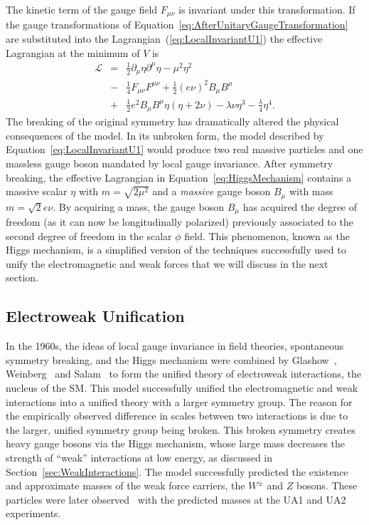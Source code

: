 The kinetic term of the gauge field $F_{\mu\nu}$ is invariant under this
transformation.  If the gauge transformations of
Equation~\ref{eq:AfterUnitaryGaugeTransformation} are substituted into the
Lagrangian~(\ref{eq:LocalInvariantU1}) the effective Lagrangian at the minimum
of $V$ is
\begin{eqnarray}
  \mathcal{L} &=& \frac{1}{2} \partial_\mu \eta \partial^\mu \eta -
  \mu^2 \eta^2  \nonumber \\
  &-& \frac{1}{4} F_{\mu\nu} F^{\mu\nu} + \frac{1}{2} (e\nu)^2 B_\mu B^\mu
  \nonumber \\
  &+& \frac{1}{2} e^2 B_\mu B^\mu \eta (\eta + 2 \nu) - \lambda \nu \eta^3 -
  \frac{\lambda }{4}\eta^4.
  \label{eq:HiggsMechanism}
\end{eqnarray}
The breaking of the original symmetry has dramatically altered the physical
consequences of the model.  In its unbroken form, the model described by
Equation~\ref{eq:LocalInvariantU1} would produce two real massive particles and
one massless gauge boson mandated by local gauge invariance.  After symmetry
breaking, the effective Lagrangian in Equation~\ref{eq:HiggsMechanism} contains
a massive scalar $\eta$ with $m = \sqrt{2\mu^2}$ and a \emph{massive} gauge
boson $B_\mu$ with mass $m = \sqrt 2 e\nu$.  By acquiring a mass, the gauge
boson $B_\mu$ has acquired the degree of freedom (as it can now be
longitudinally polarized) previously associated to the second degree of freedom
in the scalar $\phi$ field.  This phenomenon, known as the Higgs mechanism,
is a simplified version of the techniques successfully used to unify the
electromagnetic and weak forces that we will discuss in the next section.  

\subsection{Electroweak Unification}
\label{sec:ElectroweakUnification} In the 1960s, the ideas of local gauge
invariance in field theories, spontaneous symmetry breaking, and the Higgs
mechanism were combined by Glashow~\cite{Glashow:1961tr},
Weinberg~\cite{Weinberg:1967tq} and Salam~\cite{Salam:1968rm} to form the
unified theory of electroweak interactions, the nucleus of the SM\@.
This model successfully unified the electromagnetic and weak interactions into a
unified theory with a larger symmetry group.  The reason for the empirically
observed difference in scales between two interactions is due to the larger,
unified symmetry group being broken.  This broken symmetry creates heavy gauge
bosons via the Higgs mechanism, whose large mass decreases the strength of
``weak'' interactions at low energy, as discussed in
Section~\ref{sec:WeakInteractions}.  The model successfully predicted the
existence and approximate masses of the weak force carriers, the $W^\pm$ and $Z$
bosons.  These particles were later
observed~\cite{UA1WDiscovery,UA2WDiscovery,UA1ZDiscovery,UA2ZDiscovery} with the
predicted masses at the UA1 and UA2 experiments. 

